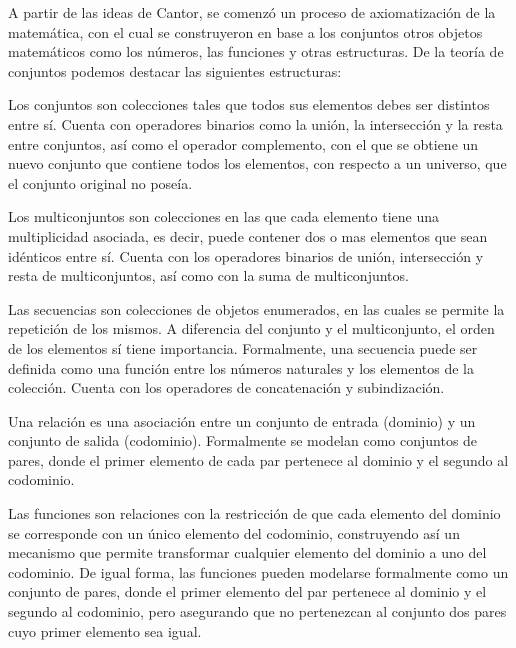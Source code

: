 A partir de las ideas de Cantor, se comenzó un proceso de axiomatización de la
matemática, con el cual se construyeron en base a los conjuntos otros objetos
matemáticos como los números, las funciones y otras estructuras. De la teoría de
conjuntos podemos destacar las siguientes estructuras:

\begin{description}[leftmargin=!,labelwidth=\widthof{\bfseries Multiconjunto}]

  \item [Conjunto] Los conjuntos son colecciones tales que todos sus elementos
  debes ser distintos entre sí. Cuenta con operadores binarios como la unión, la
  intersección y la resta entre conjuntos, así como el operador complemento, con
  el que se obtiene un nuevo conjunto que contiene todos los elementos, con
  respecto a un universo, que el conjunto original no poseía.

  \item [Multiconjunto] Los multiconjuntos son colecciones en las que cada
  elemento tiene una multiplicidad asociada, es decir, puede contener dos o mas
  elementos que sean idénticos entre sí. Cuenta con los operadores  binarios de
  unión, intersección y resta de multiconjuntos, así como con la suma de
  multiconjuntos.

  \item [Secuencia] Las secuencias son colecciones de objetos enumerados, en las
  cuales se permite la repetición de los mismos. A diferencia del conjunto y el
  multiconjunto, el orden de los elementos sí tiene importancia. Formalmente,
  una secuencia puede ser definida como una función entre los números naturales
  y los elementos de la colección. Cuenta con los operadores de concatenación y
  subindización.

  \item [Relación] Una relación es una asociación entre un conjunto de entrada
  (dominio) y un conjunto de salida (codominio). Formalmente se modelan como
  conjuntos de pares, donde el primer elemento de cada par pertenece al dominio
  y el segundo al codominio.

  \item [Función] Las funciones son relaciones con la restricción de que cada
  elemento del dominio se corresponde con un único elemento del codominio,
  construyendo así un mecanismo que permite transformar cualquier elemento del
  dominio a uno del codominio. De igual forma, las funciones pueden modelarse
  formalmente como un conjunto de pares, donde el primer elemento del par
  pertenece al dominio y el segundo al codominio, pero asegurando que no
  pertenezcan al conjunto dos pares cuyo primer elemento sea igual.

\end{description}


